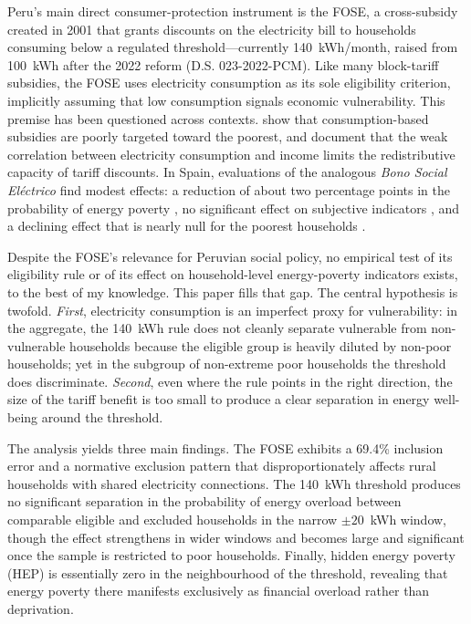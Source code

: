 \documentclass[11pt,a4paper]{article}
\begin{document}
Peru's main direct consumer-protection instrument is the FOSE, a cross-subsidy
created in 2001 that grants discounts on the electricity bill to households
consuming below a regulated threshold---currently 140~kWh/month, raised from
100~kWh after the 2022 reform (D.S. 023-2022-PCM). Like many block-tariff
subsidies, the FOSE uses electricity consumption as its sole eligibility
criterion, implicitly assuming that low consumption signals economic
vulnerability. This premise has been questioned across contexts.
\citet{whittington2015} show that consumption-based subsidies are poorly
targeted toward the poorest, and \citet{levinson2022} document that the weak
correlation between electricity consumption and income limits the
redistributive capacity of tariff discounts. In Spain, evaluations of the
analogous \textit{Bono Social El\'ectrico} find modest effects: a reduction of
about two percentage points in the probability of energy poverty
\citep{bagnoli2022}, no significant effect on subjective indicators
\citep{garcia2021}, and a declining effect that is nearly null for the poorest
households \citep{llorca2025}.

Despite the FOSE's relevance for Peruvian social policy, no empirical test of
its eligibility rule or of its effect on household-level energy-poverty
indicators exists, to the best of my knowledge. This paper fills that gap. The
central hypothesis is twofold. \textit{First}, electricity consumption is an
imperfect proxy for vulnerability: in the aggregate, the 140~kWh rule does not
cleanly separate vulnerable from non-vulnerable households because the eligible
group is heavily diluted by non-poor households; yet in the subgroup of
non-extreme poor households the threshold does discriminate. \textit{Second},
even where the rule points in the right direction, the size of the tariff
benefit is too small to produce a clear separation in energy well-being around
the threshold.

The analysis yields three main findings. The FOSE exhibits a 69.4\% inclusion
error and a normative exclusion pattern that disproportionately affects rural
households with shared electricity connections. The 140~kWh threshold produces
no significant separation in the probability of energy overload between
comparable eligible and excluded households in the narrow $\pm20$~kWh window,
though the effect strengthens in wider windows and becomes large and
significant once the sample is restricted to poor households. Finally, hidden
energy poverty (HEP) is essentially zero in the neighbourhood of the
threshold, revealing that energy poverty there manifests exclusively as
financial overload rather than deprivation.
\end{document}
